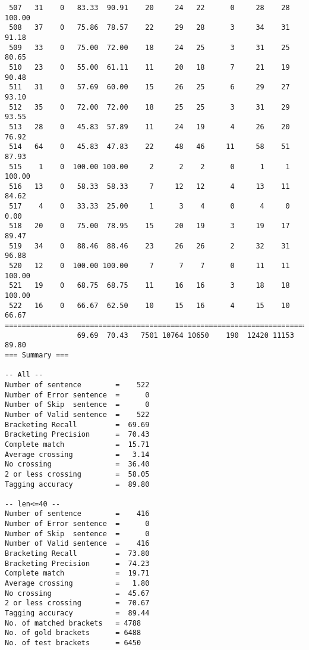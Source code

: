 \begin{verbatim}
 507   31    0   83.33  90.91    20     24   22      0     28    28   100.00
 508   37    0   75.86  78.57    22     29   28      3     34    31    91.18
 509   33    0   75.00  72.00    18     24   25      3     31    25    80.65
 510   23    0   55.00  61.11    11     20   18      7     21    19    90.48
 511   31    0   57.69  60.00    15     26   25      6     29    27    93.10
 512   35    0   72.00  72.00    18     25   25      3     31    29    93.55
 513   28    0   45.83  57.89    11     24   19      4     26    20    76.92
 514   64    0   45.83  47.83    22     48   46     11     58    51    87.93
 515    1    0  100.00 100.00     2      2    2      0      1     1   100.00
 516   13    0   58.33  58.33     7     12   12      4     13    11    84.62
 517    4    0   33.33  25.00     1      3    4      0      4     0     0.00
 518   20    0   75.00  78.95    15     20   19      3     19    17    89.47
 519   34    0   88.46  88.46    23     26   26      2     32    31    96.88
 520   12    0  100.00 100.00     7      7    7      0     11    11   100.00
 521   19    0   68.75  68.75    11     16   16      3     18    18   100.00
 522   16    0   66.67  62.50    10     15   16      4     15    10    66.67
============================================================================
                 69.69  70.43   7501 10764 10650    190  12420 11153    89.80
=== Summary ===

-- All --
Number of sentence        =    522
Number of Error sentence  =      0
Number of Skip  sentence  =      0
Number of Valid sentence  =    522
Bracketing Recall         =  69.69
Bracketing Precision      =  70.43
Complete match            =  15.71
Average crossing          =   3.14
No crossing               =  36.40
2 or less crossing        =  58.05
Tagging accuracy          =  89.80

-- len<=40 --
Number of sentence        =    416
Number of Error sentence  =      0
Number of Skip  sentence  =      0
Number of Valid sentence  =    416
Bracketing Recall         =  73.80
Bracketing Precision      =  74.23
Complete match            =  19.71
Average crossing          =   1.80
No crossing               =  45.67
2 or less crossing        =  70.67
Tagging accuracy          =  89.44
No. of matched brackets   = 4788
No. of gold brackets      = 6488
No. of test brackets      = 6450

\end{verbatim}

\normalsize

